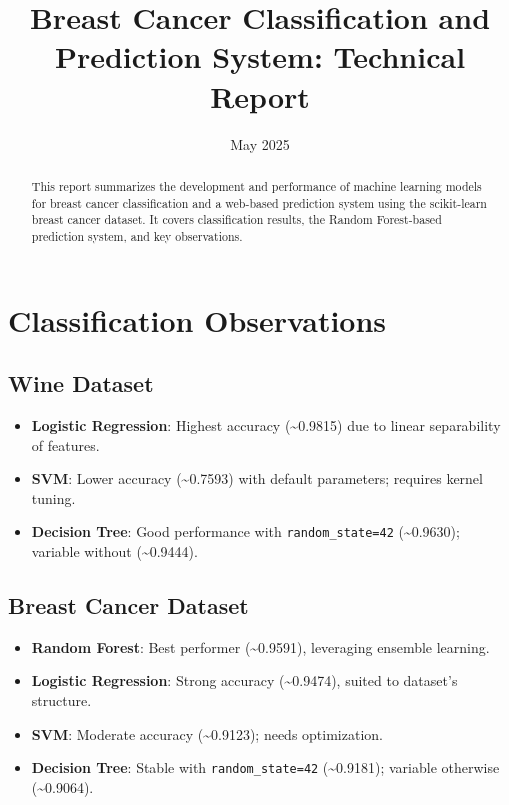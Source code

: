 \documentclass[a4paper,12pt]{article}
\begin{document}
\title{Breast Cancer Classification and Prediction System: Technical Report}
\author{}
\date{May 2025}
\maketitle

\begin{abstract}
This report summarizes the development and performance of machine learning models for breast cancer classification and a web-based prediction system using the scikit-learn breast cancer dataset. It covers classification results, the Random Forest-based prediction system, and key observations.
\end{abstract}

\section{Classification Observations}
\subsection{Wine Dataset}
\begin{itemize}[noitemsep]
    \item \textbf{Logistic Regression}: Highest accuracy (\textasciitilde0.9815) due to linear separability of features.
    \item \textbf{SVM}: Lower accuracy (\textasciitilde0.7593) with default parameters; requires kernel tuning.
    \item \textbf{Decision Tree}: Good performance with \texttt{random\_state=42} (\textasciitilde0.9630); variable without (\textasciitilde0.9444).
\end{itemize}

\subsection{Breast Cancer Dataset}
\begin{itemize}[noitemsep]
    \item \textbf{Random Forest}: Best performer (\textasciitilde0.9591), leveraging ensemble learning.
    \item \textbf{Logistic Regression}: Strong accuracy (\textasciitilde0.9474), suited to dataset’s structure.
    \item \textbf{SVM}: Moderate accuracy (\textasciitilde0.9123); needs optimization.
    \item \textbf{Decision Tree}: Stable with \texttt{random_state=42} (\textasciitilde0.9181); variable otherwise (\textasciitilde0.9064).
\end{itemize}
\end{document}
